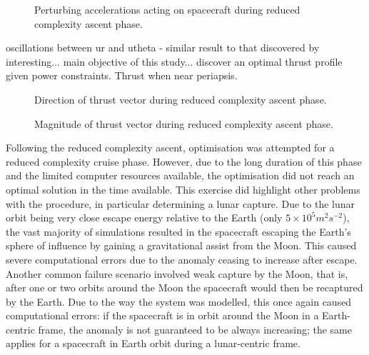 \begin{figure}
\centering
\def\svgwidth{\figurewidth}

\caption{Perturbing accelerations acting on spacecraft during reduced complexity ascent phase.}
\label{fig:Ascent2-pert2}
\end{figure}

oscillations between ur and utheta - similar result to that discovered by \textcite{Betts2003}
interesting... main objective of this study... discover an optimal thrust profile given power constraints. Thrust when near periapsis.

\begin{figure}
\centering
\def\svgwidth{\figurewidth}

\caption{Direction of thrust vector during reduced complexity ascent phase.}
\label{fig:Ascent2-thrust}
\end{figure}

\begin{figure}
\centering
\def\svgwidth{\figurewidth}

\caption{Magnitude of thrust vector during reduced complexity ascent phase.}
\label{fig:Ascent2-thrustM}
\end{figure}



Following the reduced complexity ascent, optimisation was attempted for a reduced complexity cruise phase. However, due to the long duration of this phase and the limited computer resources available, the optimisation did not reach an optimal solution in the time available. This exercise did highlight other problems with the procedure, in particular determining a lunar capture. Due to the lunar orbit being very close escape energy relative to the Earth (only $5\times10^5 m^2s^{-2}$), the vast majority of simulations resulted in the spacecraft escaping the Earth's sphere of influence by gaining a gravitational assist from the Moon. This caused severe computational errors due to the anomaly ceasing to increase after escape. Another common failure scenario involved weak capture by the Moon, that is, after one or two orbits around the Moon the spacecraft would then be recaptured by the Earth. Due to the way the system was modelled, this once again caused computational errors: if the spacecraft is in orbit around the Moon in a Earth-centric frame, the anomaly is not guaranteed to be always increasing; the same applies for a spacecraft in Earth orbit during a lunar-centric frame.

